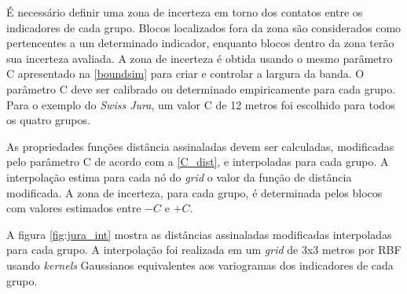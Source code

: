 É necessário definir uma zona de incerteza em torno dos contatos entre os indicadores de cada grupo. Blocos localizados fora da zona são considerados como pertencentes a um determinado indicador, enquanto blocos dentro da zona terão sua incerteza avaliada. A zona de incerteza é obtida usando o mesmo parâmetro C apresentado na \autoref{boundsim} para criar e controlar a largura da banda. O parâmetro C deve ser calibrado ou determinado empiricamente para cada grupo. Para o exemplo do \textit{Swiss Jura}, um valor C de 12 metros foi escolhido para todos os quatro grupos.

As propriedades funções distância assinaladas devem ser calculadas, modificadas pelo parâmetro C de acordo com a \autoref{C_dist}, e interpoladas para cada grupo. A interpolação estima para cada nó do \textit{grid} o valor da função de distância modificada. A zona de incerteza, para cada grupo, é determinada pelos blocos com valores estimados entre $ -C $ e $ + C $.

A figura \autoref{fig:jura_int} mostra as distâncias assinaladas modificadas interpoladas para cada grupo. A interpolação foi realizada em um \textit{grid} de 3x3 metros por RBF usando \textit{kernels} Gaussianos equivalentes aos variogramas dos indicadores de cada grupo.

